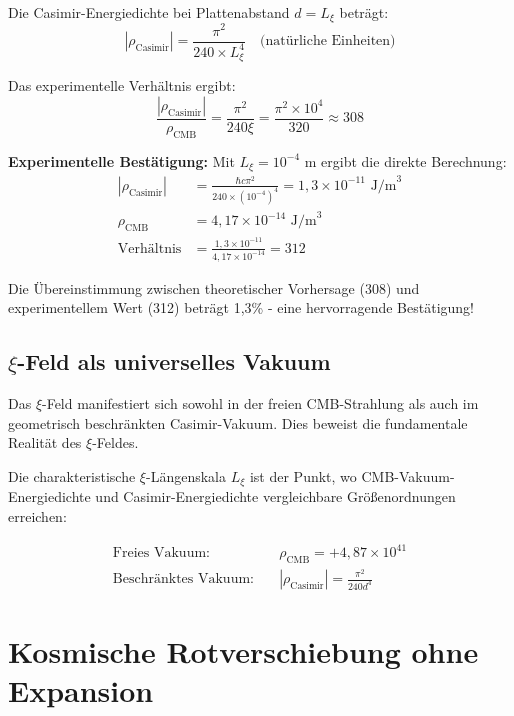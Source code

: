 \documentclass[12pt,a4paper]{article}
\begin{document}
	Die Casimir-Energiedichte bei Plattenabstand $d = L_\xi$ beträgt:
	\begin{equation}
		|\rho_{\text{Casimir}}| = \frac{\pi^2}{240 \times L_\xi^4} \quad \text{(natürliche Einheiten)}
	\end{equation}
	
	Das experimentelle Verhältnis ergibt:
	\begin{equation}
		\frac{|\rho_{\text{Casimir}}|}{\rho_{\text{CMB}}} = \frac{\pi^2}{240 \xi} = \frac{\pi^2 \times 10^4}{320} \approx 308
	\end{equation}
	
	\textbf{Experimentelle Bestätigung:}
	Mit $L_\xi = 10^{-4}$ m ergibt die direkte Berechnung:
	\begin{align}
		|\rho_{\text{Casimir}}| &= \frac{\hbar c \pi^2}{240 \times (10^{-4})^4} = 1{,}3 \times 10^{-11} \text{ J/m}^3 \\
		\rho_{\text{CMB}} &= 4{,}17 \times 10^{-14} \text{ J/m}^3 \\
		\text{Verhältnis} &= \frac{1{,}3 \times 10^{-11}}{4{,}17 \times 10^{-14}} = 312
	\end{align}
	
	Die Übereinstimmung zwischen theoretischer Vorhersage (308) und experimentellem Wert (312) beträgt 1{,}3\% - eine hervorragende Bestätigung!
	
	\subsection{$\xi$-Feld als universelles Vakuum}
	
	\begin{important}
		Das $\xi$-Feld manifestiert sich sowohl in der freien CMB-Strahlung als auch im geometrisch beschränkten Casimir-Vakuum. Dies beweist die fundamentale Realität des $\xi$-Feldes.
	\end{important}
	
	Die charakteristische $\xi$-Längenskala $L_\xi$ ist der Punkt, wo CMB-Vakuum-Energiedichte und Casimir-Energiedichte vergleichbare Größenordnungen erreichen:
	
	\begin{align}
		\text{Freies Vakuum:} \quad &\rho_{\text{CMB}} = +4{,}87 \times 10^{41} \\
		\text{Beschränktes Vakuum:} \quad &|\rho_{\text{Casimir}}| = \frac{\pi^2}{240 d^4}
	\end{align}
	
	\section{Kosmische Rotverschiebung ohne Expansion}
	
\end{document}
